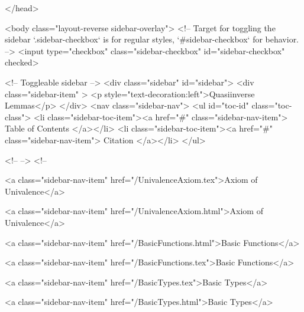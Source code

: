   
</head>




  <body class="layout-reverse sidebar-overlay">
    <!-- Target for toggling the sidebar `.sidebar-checkbox` is for regular
     styles, `#sidebar-checkbox` for behavior. -->
<input type="checkbox" class="sidebar-checkbox" id="sidebar-checkbox" checked>

<!-- Toggleable sidebar -->
<div class="sidebar" id="sidebar">
  <div class="sidebar-item" >
    <p style="text-decoration:left">Quasiinverse Lemmas</p>
  </div>
  <nav class="sidebar-nav">
    <ul id="toc-id" class="toc-class">
  <li class="sidebar-toc-item"><a href="#" class="sidebar-nav-item"> Table of Contents </a></li>
  <li class="sidebar-toc-item"><a href="#" class="sidebar-nav-item"> Citation </a></li>
</ul>


    <!--  -->
    <!-- 
      
    
      
    
      
    
      
    
      
        
      
    
      
        
          <a class="sidebar-nav-item" href="/UnivalenceAxiom.tex">Axiom of Univalence</a>
        
      
    
      
        
          <a class="sidebar-nav-item" href="/UnivalenceAxiom.html">Axiom of Univalence</a>
        
      
    
      
        
          <a class="sidebar-nav-item" href="/BasicFunctions.html">Basic Functions</a>
        
      
    
      
        
          <a class="sidebar-nav-item" href="/BasicFunctions.tex">Basic Functions</a>
        
      
    
      
        
          <a class="sidebar-nav-item" href="/BasicTypes.tex">Basic Types</a>
        
      
    
      
        
          <a class="sidebar-nav-item" href="/BasicTypes.html">Basic Types</a>
        
      
    
